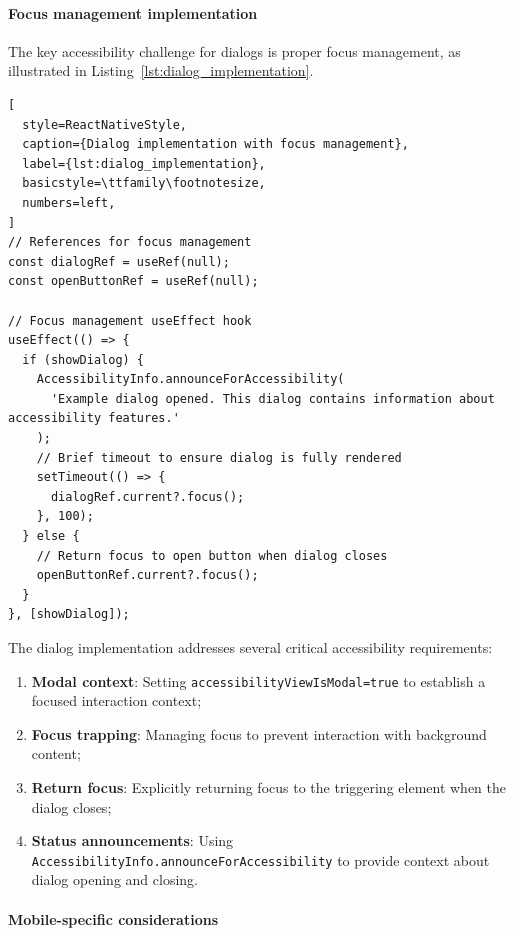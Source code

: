 \paragraph{Focus management implementation}

The key accessibility challenge for dialogs is proper focus management, as illustrated in Listing~\ref{lst:dialog_implementation}.

\begin{lstlisting}[
  style=ReactNativeStyle,
  caption={Dialog implementation with focus management},
  label={lst:dialog_implementation},
  basicstyle=\ttfamily\footnotesize,
  numbers=left,
]
// References for focus management
const dialogRef = useRef(null);
const openButtonRef = useRef(null);

// Focus management useEffect hook
useEffect(() => {
  if (showDialog) {
    AccessibilityInfo.announceForAccessibility(
      'Example dialog opened. This dialog contains information about accessibility features.'
    );
    // Brief timeout to ensure dialog is fully rendered
    setTimeout(() => {
      dialogRef.current?.focus();
    }, 100);
  } else {
    // Return focus to open button when dialog closes
    openButtonRef.current?.focus();
  }
}, [showDialog]);
\end{lstlisting}

The dialog implementation addresses several critical accessibility requirements:

\begin{enumerate}
    \item \textbf{Modal context}: Setting \texttt{accessibilityViewIsModal=true} to establish a focused interaction context;
    
    \item \textbf{Focus trapping}: Managing focus to prevent interaction with background content;
    
    \item \textbf{Return focus}: Explicitly returning focus to the triggering element when the dialog closes;
    
    \item \textbf{Status announcements}: Using \texttt{AccessibilityInfo.announceForAccessibility} to provide context about dialog opening and closing.
\end{enumerate}

\paragraph{Mobile-specific considerations}

